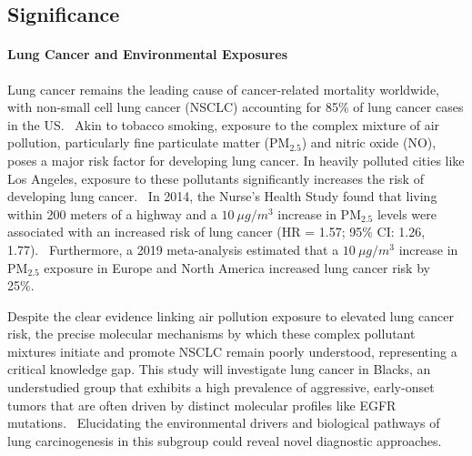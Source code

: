 \subsection{Significance}





\paragraph{Lung Cancer and Environmental Exposures}
Lung cancer remains the leading cause of cancer-related mortality worldwide, with non-small cell lung cancer (NSCLC) 
accounting for 85\% of lung cancer cases in the US.~\cite{molina_nonsmall_2008} 
Akin to tobacco smoking, exposure to the complex mixture of air pollution, particularly fine particulate matter (PM$_{2.5}$) and nitric oxide (NO), 
poses a major risk factor for developing lung cancer. 
In heavily polluted cities like Los Angeles, exposure to these pollutants significantly increases the risk of developing lung cancer.~\cite{berg_air_2023,huang_air_2021} 
In 2014, the Nurse's Health Study found that living within 200 meters of a highway and a $10~\mu g/m^{3}$ increase in PM$_{2.5}$ 
levels were associated with an increased risk of lung cancer (HR = 1.57; 95\% CI: 1.26, 1.77).~\cite{puett_particulate_2014} 
Furthermore, a 2019 meta-analysis estimated that a $10~\mu g/m^{3}$ increase in PM$_{2.5}$ exposure in Europe and North America increased lung cancer risk by 25\%.~\cite{huang_ambient_2021}

Despite the clear evidence linking air pollution exposure to elevated lung cancer risk, 
the precise molecular mechanisms by which these complex pollutant mixtures initiate and promote NSCLC remain poorly understood, 
representing a critical knowledge gap. 
This study will investigate lung cancer in Blacks, an understudied group that exhibits a high prevalence of aggressive, 
early-onset tumors that are often driven by distinct molecular profiles like EGFR mutations.~\cite{marcinkiewicz_impact_2023}
Elucidating the environmental drivers and biological pathways of lung carcinogenesis in this subgroup could reveal novel diagnostic approaches. 

